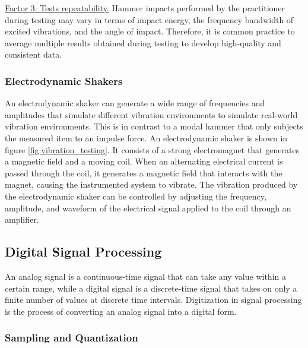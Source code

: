 \documentclass[12pt,letter]{article}
\begin{document}
\underline{Factor 3: Tests repeatability.} Hammer impacts performed by the practitioner during testing may vary in terms of impact energy, the frequency bandwidth of excited vibrations, and the angle of impact. Therefore, it is common practice to average multiple results obtained during testing to develop high-quality and consistent data.











\subsubsection{Electrodynamic Shakers}

An electrodynamic shaker can generate a wide range of frequencies and amplitudes that simulate different vibration environments to simulate real-world vibration environments. This is in contrast to a modal hammer that only subjects the measured item to an impulse force. An electrodynamic shaker is shown in figure \ref{fig:vibration_testing}. It consists of a strong electromagnet that generates a magnetic field and a moving coil. When an alternating electrical current is passed through the coil, it generates a magnetic field that interacts with the magnet, causing the instrumented system to vibrate. The vibration produced by the electrodynamic shaker can be controlled by adjusting the frequency, amplitude, and waveform of the electrical signal applied to the coil through an amplifier.



\subsection{Digital Signal Processing}

 An analog signal is a continuous-time signal that can take any value within a certain range, while a digital signal is a discrete-time signal that takes on only a finite number of values at discrete time intervals. Digitization in signal processing is the process of converting an analog signal into a digital form.

\subsubsection{Sampling and Quantization}
\end{document}
